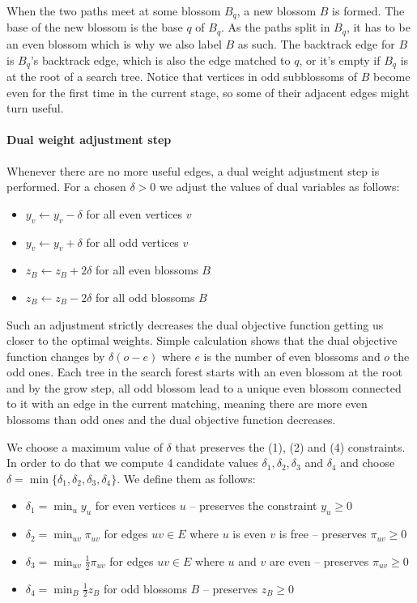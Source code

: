 When the two paths meet at some blossom $B_q$, a new blossom $B$ is formed. The base of the new blossom is the base $q$ of $B_q$. As the paths split in $B_q$, it has to be an even blossom which is why we also label $B$ as such. The backtrack edge for $B$ is $B_q$'s backtrack edge, which is also the edge matched to $q$, or it's empty if $B_q$ is at the root of a search tree. Notice that vertices in odd subblossoms of $B$ become even for the first time in the current stage, so some of their adjacent edges might turn useful.

\paragraph*{Dual weight adjustment step}

Whenever there are no more useful edges, a dual weight adjustment step is performed. For a chosen $\delta > 0$ we adjust the values of dual variables as follows:

\begin{itemize}
    \item $y_v \gets y_v - \delta$ for all even vertices $v$
    \item $y_v \gets y_v + \delta$ for all odd vertices $v$
    \item $z_B \gets z_B + 2\delta$ for all even blossoms $B$
    \item $z_B \gets z_B - 2\delta$ for all odd blossoms $B$
\end{itemize}

Such an adjustment strictly decreases the dual objective function getting us closer to the optimal weights. Simple calculation shows that the dual objective function changes by $\delta(o - e)$ where $e$ is the number of even blossoms and $o$ the odd ones. Each tree in the search forest starts with an even blossom at the root and by the grow step, all odd blossom lead to a unique even blossom connected to it with an edge in the current matching, meaning there are more even blossoms than odd ones and the dual objective function decreases.

We choose a maximum value of $\delta$ that preserves the (1), (2) and (4) constraints. In order to do that we compute 4 candidate values $\delta_1, \delta_2, \delta_3$ and $\delta_4$ and choose $\delta = \min \{\delta_1, \delta_2, \delta_3, \delta_4\}$. We define them as follows:

\begin{itemize}
    \item $\delta_1 = \min_{u} y_u$ for even vertices $u$ – preserves the constraint $y_u \geq 0$
    \item $\delta_2 = \min_{uv} \pi_{uv}$ for edges $uv \in E$ where $u$ is even $v$ is free – preserves $\pi_{uv} \geq 0$
    \item $\delta_3 = \min_{uv} \frac{1}{2}\pi_{uv}$ for edges $uv \in E$ where $u$ and $v$ are even – preserves $\pi_{uv} \geq 0$
    \item $\delta_4 = \min_{B} \frac{1}{2} z_B$ for odd blossoms $B$ – preserves $z_B \geq 0$
\end{itemize}

